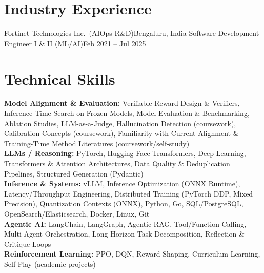 \documentclass[letterpaper,11pt]{article}
\begin{document}
\section{Industry Experience}
\resumeSubHeadingListStart
\resumeSubheading
{Fortinet Technologies Inc.\ (AIOps R\&D)}{Bengaluru, India}
{Software Development Engineer I \& II (ML/AI)}{Feb 2021 -- Jul 2025}
\resumeItemListStart


\resumeItemListEnd
\resumeSubHeadingListEnd

\section{Technical Skills}
\footnotesize
\textbf{Model Alignment \& Evaluation:} Verifiable-Reward Design \& Verifiers, Inference-Time Search on Frozen Models,
  Model Evaluation \& Benchmarking, Ablation Studies, LLM-as-a-Judge, Hallucination Detection (coursework),
  Calibration Concepts (coursework), Familiarity with Current Alignment \& Training-Time Method Literatures (coursework/self-study) \\[1pt]
\textbf{LLMs / Reasoning:} PyTorch, Hugging Face Transformers, Deep Learning, Transformers \& Attention Architectures,
  Data Quality \& Deduplication Pipelines, Structured Generation (Pydantic) \\[1pt]
\textbf{Inference \& Systems:} vLLM, Inference Optimization (ONNX Runtime), Latency/Throughput Engineering,
  Distributed Training (PyTorch DDP, Mixed Precision), Quantization Contexts (ONNX),
  Python, Go, SQL/PostgreSQL, OpenSearch/Elasticsearch, Docker, Linux, Git \\[1pt]
\textbf{Agentic AI:} LangChain, LangGraph, Agentic RAG, Tool/Function Calling, Multi-Agent Orchestration,
  Long-Horizon Task Decomposition, Reflection \& Critique Loops \\[1pt]
\textbf{Reinforcement Learning:} PPO, DQN, Reward Shaping, Curriculum Learning, Self-Play (academic projects)
\end{document}
